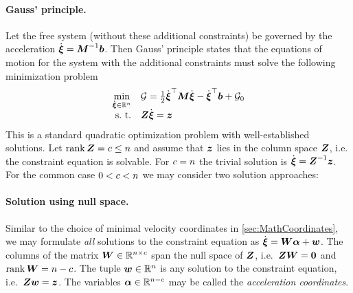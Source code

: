 \paragraph{Gauss' principle.}
Let the free system (without these additional constraints) be governed by the acceleration $\sysVeld = \sysInertiaMat^{-1}\sysForce$.
Then Gauss' principle states that the equations of motion for the system with the additional constraints must solve the following minimization problem
\begin{align}\label{eq:GaussPrincipleAccConstraints}
 \begin{array}{rl}
  \minOp[\sysVeld\in\RealNum^{\dimConfigSpace}] & \GaussianConstraint = \tfrac{1}{2} \sysVeld^\top \sysInertiaMat \sysVeld - \sysVeld^\top \sysForce + \GaussianConstraint_0 \\
  \text{s.\ t.} & \accConstraintMat \sysVeld = \accConstraintB
 \end{array}
\end{align}
This is a standard quadratic optimization problem with well-established solutions.
Let $\rank\accConstraintMat = c \leq \dimConfigSpace$ and assume that $\accConstraintB$ lies in the column space $\accConstraintMat$, i.e. the constraint equation is solvable.
For $c=\dimConfigSpace$ the trivial solution is $\sysVeld = \accConstraintMat^{-1}\accConstraintB$.
For the common case $0 < c < \dimConfigSpace$ we may consider two solution approaches:

\paragraph{Solution using null space.}
Similar to the choice of minimal velocity coordinates in \autoref{sec:MathCoordinates}, we may formulate \textit{all} solutions to the constraint equation as $\sysVeld = \mat{W}\tuple{\alpha} + \tuple{w}$.
The columns of the matrix $\mat{W}\in\RealNum^{\dimConfigSpace\times c}$ span the null space of $\accConstraintMat$, i.e.\ $\accConstraintMat \mat{W}=\mat{0}$ and $\rank\mat{W} = \dimConfigSpace-c$. 
The tuple $\tuple{w} \in \RealNum^\dimConfigSpace$ is any solution to the constraint equation, i.e.\ $\accConstraintMat\tuple{w} = \accConstraintB$.
The variables $\tuple{\alpha} \in \RealNum^{\dimConfigSpace-c}$ may be called the \textit{acceleration coordinates}.

